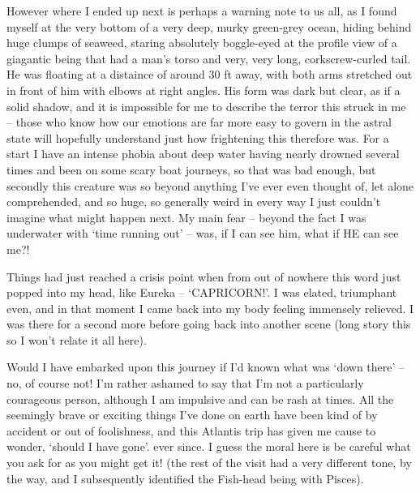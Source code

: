 \begin{footnotesize}
\begin{sffamily}
However where I ended up next is perhaps a warning note to us all, as I found myself at the very bottom of a very deep, murky green-grey ocean, hiding behind huge clumps of seaweed, staring absolutely boggle-eyed at the profile view of a giagantic being that had a man's torso and very, very long, corkscrew-curled tail. He was floating at a distaince of around 30 ft away, with both arms stretched out in front of him with elbows at right angles. His form was dark but clear, as if a solid shadow, and it is impossible for me to describe the terror this struck in me – those who know how our emotions are far more easy to govern in the astral state will hopefully understand just how frightening this therefore was. For a start I have an intense phobia about deep water having nearly drowned several times and been on some scary boat journeys, so that was bad enough, but secondly this creature was so beyond anything I've ever even thought of, let alone comprehended, and so huge, so generally weird in every way I just couldn't imagine what might happen next. My main fear – beyond the fact I was underwater with `time running out’ – was, if I can see him, what if HE can see me?! 

Things had just reached a crisis point when from out of nowhere this word just popped into my head, like Eureka – `CAPRICORN!'. I was elated, triumphant even, and in that moment I came back into my body feeling immensely relieved. I was there for a second more before going back into another scene (long story this so I won't relate it all here). 

Would I have embarked upon this journey if I'd known what was `down there’ – no, of course not! I'm rather ashamed to say that I'm not a particularly courageous person, although I am impulsive and can be rash at times. All the seemingly brave or exciting things I've done on earth have been kind of by accident or out of foolishness, and this Atlantis trip has given me cause to wonder, `should I have gone'. ever since. I guess the moral here is be careful what you ask for as you might get it! (the rest of the visit had a very different tone, by the way, and I subsequently identified the Fish-head being with Pisces).


\hfill


\end{sffamily}\end{footnotesize}
